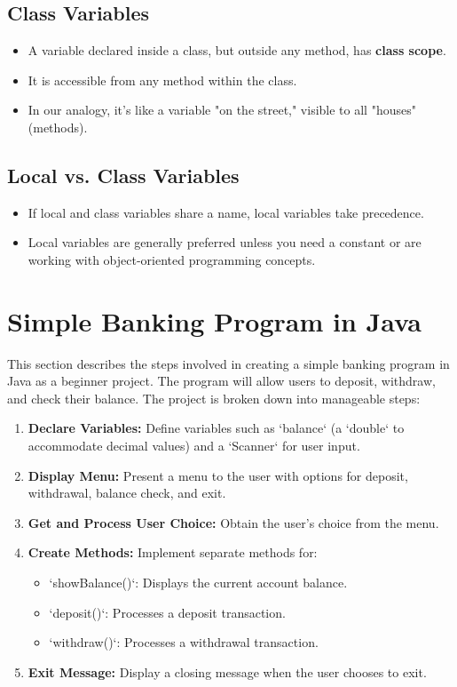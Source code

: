 \documentclass{article}
\begin{document}
\subsection{Class Variables}
\begin{itemize}
    \item A variable declared inside a class, but outside any method, has \textbf{class scope}.
    \item It is accessible from any method within the class.
    \item  In our analogy, it's like a variable "on the street," visible to all "houses" (methods).
\end{itemize}

\subsection{Local vs. Class Variables}
\begin{itemize}
    \item If local and class variables share a name, local variables take precedence.
    \item Local variables are generally preferred unless you need a constant or are working with object-oriented programming concepts.
\end{itemize}


\section{Simple Banking Program in Java}

This section describes the steps involved in creating a simple banking program in Java as a beginner project.  The program will allow users to deposit, withdraw, and check their balance.  The project is broken down into manageable steps:

\begin{enumerate}
    \item \textbf{Declare Variables:} Define variables such as `balance` (a `double` to accommodate decimal values) and a `Scanner` for user input.
    \item \textbf{Display Menu:} Present a menu to the user with options for deposit, withdrawal, balance check, and exit.
    \item \textbf{Get and Process User Choice:} Obtain the user's choice from the menu.
    \item \textbf{Create Methods:} Implement separate methods for:
    \begin{itemize}
        \item `showBalance()`: Displays the current account balance.
        \item `deposit()`: Processes a deposit transaction.
        \item `withdraw()`: Processes a withdrawal transaction.
    \end{itemize}
    \item \textbf{Exit Message:} Display a closing message when the user chooses to exit.
\end{enumerate}
\end{document}
